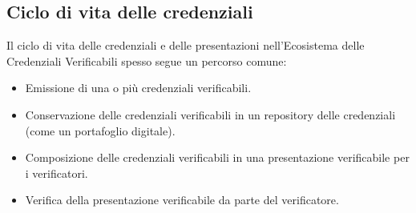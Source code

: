 \subsection{Ciclo di vita delle credenziali}
Il ciclo di vita delle credenziali e delle presentazioni nell'Ecosistema delle Credenziali Verificabili spesso segue un percorso comune:
\begin{itemize}
\item Emissione di una o più credenziali verificabili.
\item Conservazione delle credenziali verificabili in un repository delle credenziali (come un portafoglio digitale).
\item Composizione delle credenziali verificabili in una presentazione verificabile per i verificatori.
\item Verifica della presentazione verificabile da parte del verificatore.
\end{itemize}

